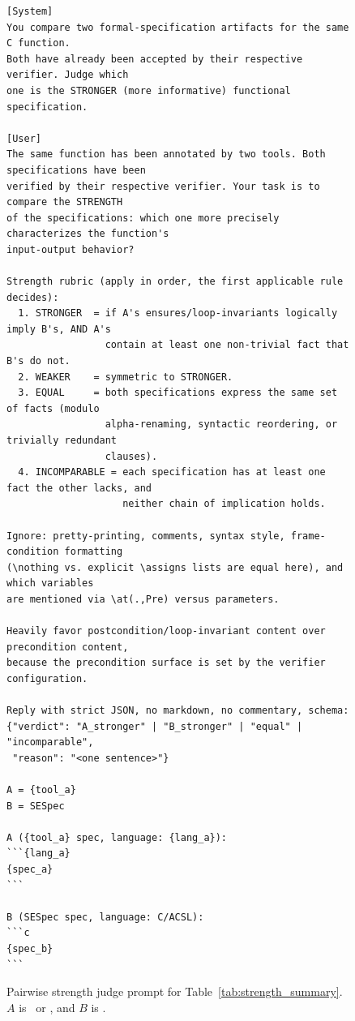\begin{figure}[!htbp]
\centering
\begin{tcolorbox}[promptboxcompact, title={Pairwise strength-judge prompt}, width=\columnwidth]
\begin{lstlisting}[style=PromptInnerCompact]
[System]
You compare two formal-specification artifacts for the same C function.
Both have already been accepted by their respective verifier. Judge which
one is the STRONGER (more informative) functional specification.

[User]
The same function has been annotated by two tools. Both specifications have been
verified by their respective verifier. Your task is to compare the STRENGTH
of the specifications: which one more precisely characterizes the function's
input-output behavior?

Strength rubric (apply in order, the first applicable rule decides):
  1. STRONGER  = if A's ensures/loop-invariants logically imply B's, AND A's
                 contain at least one non-trivial fact that B's do not.
  2. WEAKER    = symmetric to STRONGER.
  3. EQUAL     = both specifications express the same set of facts (modulo
                 alpha-renaming, syntactic reordering, or trivially redundant
                 clauses).
  4. INCOMPARABLE = each specification has at least one fact the other lacks, and
                    neither chain of implication holds.

Ignore: pretty-printing, comments, syntax style, frame-condition formatting
(\nothing vs. explicit \assigns lists are equal here), and which variables
are mentioned via \at(.,Pre) versus parameters.

Heavily favor postcondition/loop-invariant content over precondition content,
because the precondition surface is set by the verifier configuration.

Reply with strict JSON, no markdown, no commentary, schema:
{"verdict": "A_stronger" | "B_stronger" | "equal" | "incomparable",
 "reason": "<one sentence>"}

A = {tool_a}
B = SESpec

A ({tool_a} spec, language: {lang_a}):
```{lang_a}
{spec_a}
```

B (SESpec spec, language: C/ACSL):
```c
{spec_b}
```
\end{lstlisting}
\end{tcolorbox}
\caption{Pairwise strength judge prompt for Table~\ref{tab:strength_summary}. \(A\) is \autospec\ or \specgen, and \(B\) is \toolname.}
\label{fig:prompt-judge}
\end{figure}

